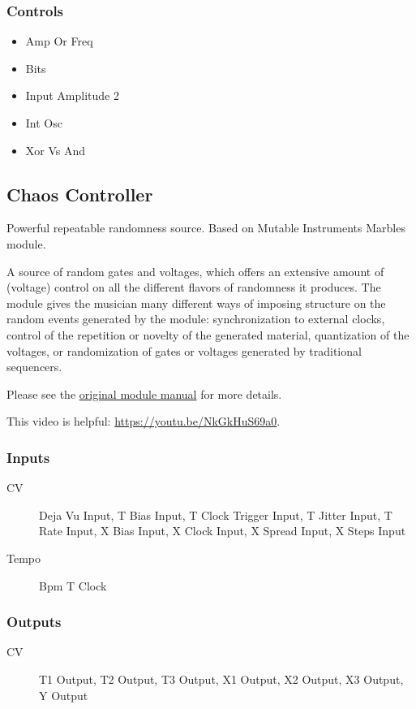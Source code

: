\subsubsection{Controls}
\begin{itemize}
\item Amp Or Freq
\item Bits
\item Input Amplitude 2
\item Int Osc
\item Xor Vs And
\end{itemize}

\subsection{Chaos Controller}

Powerful repeatable randomness source. Based on Mutable Instruments Marbles module.

A source of random gates and voltages, which offers an extensive amount of (voltage) control on all the different flavors of randomness it produces. The module gives the musician many different ways of imposing structure on the random events generated by the module: synchronization to external clocks, control of the repetition or novelty of the generated material, quantization of the voltages, or randomization of gates or voltages generated by traditional sequencers.

Please see the \href{https://www.mutable-instruments.net/modules/marbles/manual/}{original module manual} for more details.

This video is helpful: \url{https://youtu.be/NkGkHuS69a0}.

\subsubsection{Inputs}
\begin{description}
\item [CV] Deja Vu Input, T Bias Input, T Clock Trigger Input, T Jitter Input, T Rate Input, X Bias Input, X Clock Input, X Spread Input, X Steps Input
\item [Tempo] Bpm T Clock
\end{description}

\subsubsection{Outputs}
\begin{description}
\item [CV] T1 Output, T2 Output, T3 Output, X1 Output, X2 Output, X3 Output, Y Output
\end{description}

